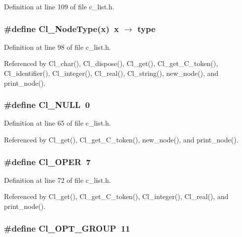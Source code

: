 Definition at line 109 of file c\_\-list.h.
\subsubsection{\setlength{\rightskip}{0pt plus 5cm}\#define Cl\_\-Node\-Type(x)~x $\rightarrow$ type}\label{c__list_8h_0ceddfc5baa6f15120e5ac0e36fe7d66}




Definition at line 98 of file c\_\-list.h.

Referenced by Cl\_\-char(), Cl\_\-dispose(), Cl\_\-get(), Cl\_\-get\_\-C\_\-token(), Cl\_\-identifier(), Cl\_\-integer(), Cl\_\-real(), Cl\_\-string(), new\_\-node(), and print\_\-node().
\subsubsection{\setlength{\rightskip}{0pt plus 5cm}\#define Cl\_\-NULL~0}\label{c__list_8h_503fa934b68e59e1cbc6245b88ced09f}




Definition at line 65 of file c\_\-list.h.

Referenced by Cl\_\-get(), Cl\_\-get\_\-C\_\-token(), new\_\-node(), and print\_\-node().
\subsubsection{\setlength{\rightskip}{0pt plus 5cm}\#define Cl\_\-OPER~7}\label{c__list_8h_76f0cc4279b0cf44195b20cc84f04066}




Definition at line 72 of file c\_\-list.h.

Referenced by Cl\_\-get(), Cl\_\-get\_\-C\_\-token(), Cl\_\-integer(), Cl\_\-real(), and print\_\-node().
\subsubsection{\setlength{\rightskip}{0pt plus 5cm}\#define Cl\_\-OPT\_\-GROUP~11}\label{c__list_8h_d621e6399463d01db8563c548fff3245}




